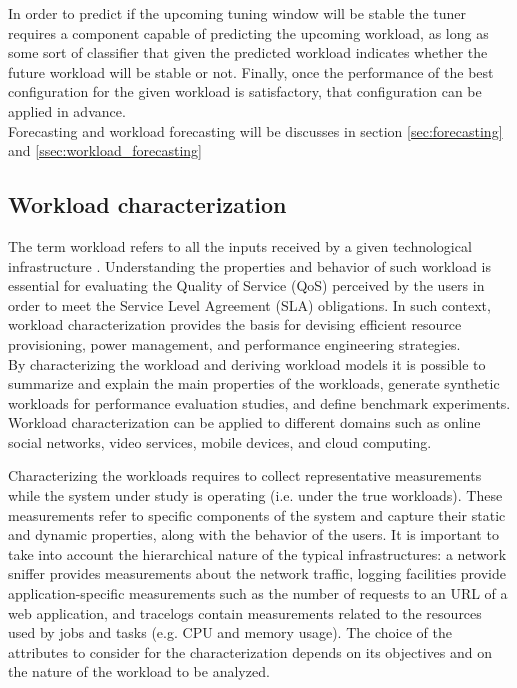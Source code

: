 \documentclass[a4paper]{article} %
\begin{document}
	In order to predict if the upcoming tuning window will be stable the tuner requires a component capable of predicting the upcoming workload, as long as some sort of classifier that given the predicted workload indicates whether the future workload will be stable or not.
	Finally, once the performance of the best configuration for the given workload is satisfactory, that configuration can be applied in advance.\\
	Forecasting and workload forecasting will be discusses in section \ref{sec:forecasting} and \ref{ssec:workload_forecasting}	
	
	\subsection{Workload characterization} \label{ssec:workload_characterization}
	The term workload refers to all the inputs received by a given technological infrastructure \cite{WorkloadCharacterization}. Understanding the properties and behavior of such workload is essential for evaluating the Quality of Service (QoS) perceived by the users in order to meet the Service Level Agreement (SLA) obligations. In such context, workload characterization provides the basis for devising efficient resource provisioning, power management, and performance engineering strategies.\\
	By characterizing the workload and deriving workload models it is possible to summarize and explain the main properties of the workloads, generate synthetic workloads for performance evaluation studies, and define benchmark experiments. Workload characterization can be applied to different domains such as online social networks, video services, mobile devices, and cloud computing.
	
	Characterizing the workloads requires to collect representative measurements while the system under study is operating (i.e. under the true workloads). These measurements refer to specific components of the system and capture their static and dynamic properties, along with the behavior of the users. It is important to take into account the hierarchical nature of the typical infrastructures: a network sniffer provides measurements about the network traffic, logging facilities provide application-specific measurements such as the number of requests to an URL of a web application, and tracelogs contain measurements related to the resources used by jobs and tasks (e.g. CPU and memory usage). The choice of the attributes to consider for the characterization depends on its objectives and on the nature of the workload to be analyzed.
	
\end{document}
